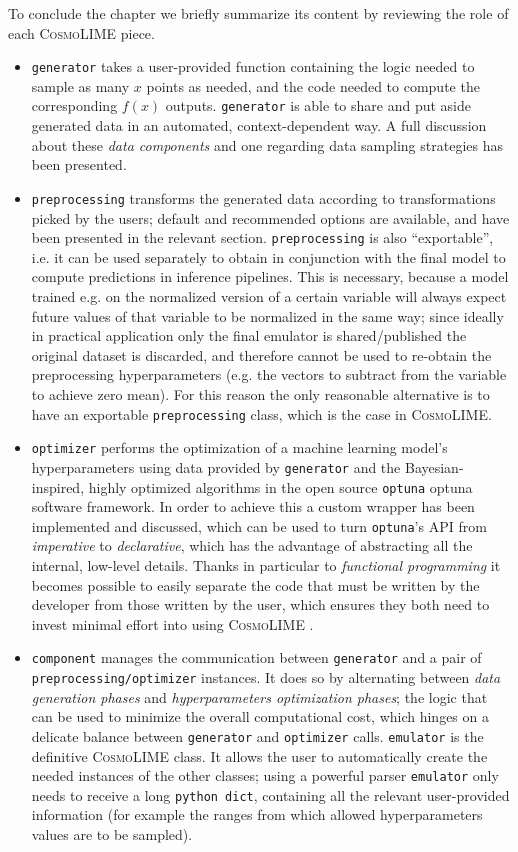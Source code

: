 To conclude the chapter we briefly summarize its content by reviewing the role of each \textsc{CosmoLIME} piece.
\begin{itemize}
    \item \texttt{generator} takes a user-provided function containing the logic needed to sample as many $x$ points as needed, and the code needed to compute the corresponding $f(x)$ outputs. \texttt{generator} is able to share and put aside generated data in an automated, context-dependent way. A full discussion about these \emph{data components} and one regarding data sampling strategies has been presented.
    \item \texttt{preprocessing} transforms the generated data according to transformations picked by the users; default and recommended options are available, and have been presented in the relevant section. \texttt{preprocessing} is also ``exportable'', i.e. it can be used separately to obtain in conjunction with the final model to compute predictions in inference pipelines. This is necessary, because a model trained e.g. on the normalized version of a certain variable will always expect future values of that variable to be normalized in the same way; since ideally in practical application only the final emulator is shared/published the original dataset is discarded, and therefore cannot be used to re-obtain the preprocessing hyperparameters (e.g. the vectors to subtract from the variable to achieve zero mean). For this reason the only reasonable alternative is to have an exportable \texttt{preprocessing} class, which is the case in \textsc{CosmoLIME}.
    \item \texttt{optimizer} performs the optimization of a machine learning model's hyperparameters using data provided by \texttt{generator} and the Bayesian-inspired, highly optimized algorithms in the open source \texttt{optuna} optuna software framework. In order to achieve this a custom wrapper has been implemented and discussed, which can be used to turn \texttt{optuna}'s API from \emph{imperative} to \emph{declarative}, which has the advantage of abstracting all the internal, low-level details. Thanks in particular to \emph{functional programming} it becomes possible to easily separate the code that must be written by the developer from those written by the user, which ensures they both need to invest minimal effort into using \textsc{CosmoLIME} .
    \item \texttt{component} manages the communication between \texttt{generator} and a pair of \texttt{preprocessing/optimizer} instances. It does so by alternating between \emph{data generation phases} and \emph{hyperparameters optimization phases}; the logic that can be used to minimize the overall computational cost, which hinges on a delicate balance between \texttt{generator} and \texttt{optimizer} calls.
    \texttt{emulator} is the definitive \textsc{CosmoLIME} class. It allows the user to automatically create the needed instances of the other classes; using a powerful parser \texttt{emulator} only needs to receive a long \texttt{python dict}, containing all the relevant user-provided information (for example the ranges from which allowed hyperparameters values are to be sampled).
\end{itemize}

